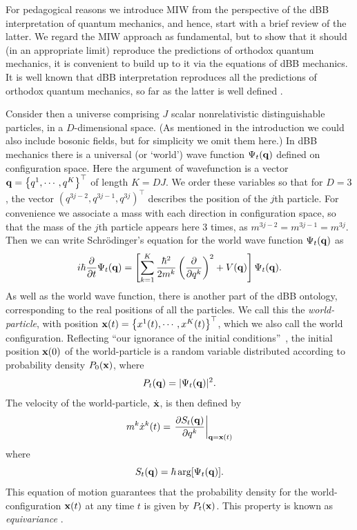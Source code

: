 \documentclass[twocolumn,aps,pra,amsmath,amssymb,superscriptaddress]{revtex4}
\newcommand{\beq}{\begin{equation}}
\newcommand{\eeq}{\end{equation}}
\newcommand{\sch}{Schr\"odinger}
\newcommand{\sq}[1]{\left[ {#1} \right]}
\newcommand{\cu}[1]{\left\{ {#1} \right\}}
\newcommand{\ro}[1]{\left( {#1} \right)}
\newcommand{\tp}{^{\top}}
\renewcommand{\(}{\left(}
\renewcommand{\)}{\right)}
\newcommand{\dbd}[2]{\frac{\partial{#1}}{\partial{#2}}}
\newcommand{\at}[2]{\left.{#1}\right|_{#2}}
\newcommand{\blk}{\color{black}}
\begin{document}
For pedagogical reasons we introduce MIW from the perspective of the dBB interpretation of quantum mechanics, and hence, start with a brief review of the latter.  
We regard the MIW approach as fundamental, but to show that it should (in an appropriate limit) 
reproduce the predictions of orthodox quantum mechanics, 
it is convenient to build up to it via the equations of dBB mechanics.
It is well known that dBB interpretation reproduces all 
the predictions of orthodox quantum mechanics, so far as the latter is well defined \cite{hollandbook, BerZan05}. 


Consider then a universe comprising $J$  scalar nonrelativistic distinguishable
particles, in a \blk $D$-dimensional space. (As mentioned in the introduction we
could also include bosonic fields, but for simplicity we omit them here.) In dBB
mechanics there is a universal (or `world') wave function $\Psi_t({\bf q})$
defined on configuration space. Here the argument of wavefunction is a vector
${\bf q} = \cu{ {q}^1 , \cdots ,{q}^{K} }\tp$ of length $K=D{J}$.  We order
these variables so that  for $D=3$, the vector $(q^{3j-2},q^{3j-1},q^{3j})\tp$
describes the position of the $j$th \blk particle. For convenience we associate
a mass with each direction in configuration space, so that the mass of the $j$th
particle appears here 3 times, as $m^{3j-2} = m^{3j-1} = m^{3j}$. \blk Then we
can write \sch's  equation for the world wave function $\Psi_t({\bf q})$ as 
\beq 
\label{schr}
i\hbar \dbd{}{t}\Psi_{t}({\bf q}) = \sq{ \sum_{k=1}^{K} \frac{\hbar^2}{2 m^k} \ro{\dbd{}{q^k}}^2 + 
V({\bf q}) } \Psi_t({\bf q}).
\eeq 
As well as the world wave function, there is another part of the dBB ontology,
corresponding to the real positions of all the particles. We call this the {\em
world-particle}, with position ${\bf x}(t) = \cu{ {x}^1(t) , \cdots ,{x}^{K}(t)
}\tp$, which we also call the world configuration.  
Reflecting  ``our ignorance of the  initial conditions''~\cite{dbb}, \blk 
the initial position ${\bf x}(0)$ of the world-particle is a random
variable distributed according to probability density \blk $P_0({\bf x})$, \blk
where 
\beq
P_t({\bf q}) = |\Psi_{t}({\bf q})|^2.
\eeq
The velocity of the world-particle, $\dot {\bf x}$, \blk is then defined by  
\beq \label{velocityS}
m^k \dot{x}^k(t) =  \at{\dbd{S_t({\bf q})}{q^k}}{{\bf q}={\bf x}(t)}
\eeq
where 
\beq \label{sdef}
S_t({\bf q}) = \hbar \arg[\Psi_t({\bf q})].
\eeq 
This equation of motion guarantees that the probability   density \blk for the world-configuration 
${\bf x}(t)$ at any time $t$ is given by $P_t({\bf x})$. This property is known 
as {\em equivariance} \cite{hollandbook,quantumequilibrium}.
\end{document}
